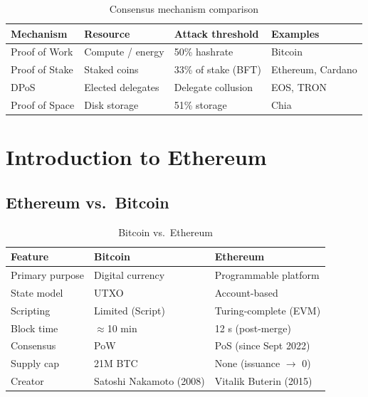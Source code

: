\documentclass[12pt,a4paper,openany]{book}
\theoremstyle{definition}
\theoremstyle{plain}
\theoremstyle{remark}
\begin{document}
\begin{table}[h]
\centering
\caption{Consensus mechanism comparison}
\begin{tabular}{p{2.5cm}p{3cm}p{3cm}p{3cm}}
\toprule
\textbf{Mechanism} & \textbf{Resource} & \textbf{Attack threshold} & \textbf{Examples} \\
\midrule
Proof of Work & Compute / energy & 50\% hashrate & Bitcoin \\
Proof of Stake & Staked coins & 33\% of stake (BFT) & Ethereum, Cardano \\
DPoS & Elected delegates & Delegate collusion & EOS, TRON \\
Proof of Space & Disk storage & 51\% storage & Chia \\
\bottomrule
\end{tabular}
\end{table}


\chapter{Introduction to Ethereum}
\label{chap:eth_intro}

\section{Ethereum vs.\ Bitcoin}

\begin{table}[h]
\centering
\caption{Bitcoin vs.\ Ethereum}
\begin{tabular}{lll}
\toprule
\textbf{Feature} & \textbf{Bitcoin} & \textbf{Ethereum} \\
\midrule
Primary purpose & Digital currency & Programmable platform \\
State model & UTXO & Account-based \\
Scripting & Limited (Script) & Turing-complete (EVM) \\
Block time & $\approx$10 min & 12 s (post-merge) \\
Consensus & PoW & PoS (since Sept 2022) \\
Supply cap & 21M BTC & None (issuance $\to$ 0) \\
Creator & Satoshi Nakamoto (2008) & Vitalik Buterin (2015) \\
\bottomrule
\end{tabular}
\end{table}
\end{document}
